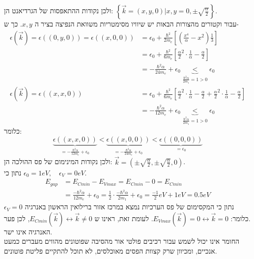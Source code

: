 \documentclass{article}
\begin{document}
\begin{Answer}
ולכן נקודות ההתאפסות של הגרדיאנט הן: ${\left\{ \vec{k}=\left( x,y,0 \right)\vert x,y = 0,\pm\sqrt{\frac{\alpha}{2}} \right\}}$.\\ עבור וקטורים מהצורות הבאות יש שיוויו מסימטריות משוואת הנפיצה בציר ה ${x,y}$. כך ש- 
\begin{align*}
    {\epsilon(\vec{k})=\epsilon((0,y,0))=\epsilon((x,0,0))}&= \epsilon_{0}+\frac{\hbar^2}{2m_{e}}\left[ \left( \frac{x^4}{\alpha}-x^2 \right)\frac{1}{3}\right]\\
    &=\epsilon_{0}+\frac{\hbar^2}{6m_{e}}\left[ \frac{\alpha}{2}^2\cdot\frac{1}{\alpha}-\frac{\alpha}{2} \right]\\
    &= - \frac{\hbar^{2} \alpha}{24 m_{e}} + \epsilon_{0} \underbrace{<}_{\frac{\hbar^2\alpha}{2m_1}=1>0}\epsilon_{0}\\
    \epsilon(\vec{k})=\epsilon((x,x,0))&=\epsilon_{0}+\frac{\hbar^2}{6m_{e}}\left[ \frac{\alpha}{2}^2\cdot\frac{1}{\alpha}-\frac{\alpha}{2} +\frac{\alpha}{2}^2\cdot\frac{1}{\alpha}-\frac{\alpha}{2} \right]\\
    &= - \frac{\hbar^{2} \alpha}{12 m_{e}} + \epsilon_{0} \underbrace{<}_{\frac{\hbar^2\alpha}{2m_1}=1>0}\epsilon_{0}
\end{align*}
כלומר:
\begin{equation*}
    \underbrace{\epsilon((x,x,0))}_{=- \frac{\hbar^{2} \alpha}{12 m_{e}} + \epsilon_{0}}<\underbrace{\epsilon((x,0,0))}_{=- \frac{\hbar^{2} \alpha}{24 m_{e}} + \epsilon_{0}}<\underbrace{\epsilon((0,0,0))}_{=\epsilon_{0}}
\end{equation*}
ולכן נקודות המינימום של פס ההולכה הן: $\vec{k}=\left( \pm\sqrt{\frac{\alpha}{2}},\pm\sqrt{\frac{\alpha}{2}},0 \right)$.\\
נתון כי $\epsilon_{0}=1eV,\quad \epsilon_{V}=0eV$.
\begin{align*}
    E_{gap}&=E_{Cmin}-E_{Vmax}=E_{Cmin}-0=E_{Cmin}\\
    &=  \frac{-\hbar^{2} \alpha}{12 m_{e}} + \epsilon_{0}=\frac{1}{2}\cdot \frac{-\hbar^{2} \alpha}{2 m_{1}}+\epsilon_{0}=\frac{-1}{2}eV+1eV=0.5eV
\end{align*}
נתון כי המקסימום של פס הערכיות נמצא במרכז אזור ברילואין הראשון באנרגיה $\epsilon_{V}=0$.כלומר:
$E_{Vmax}(\vec{k})=0\leftrightarrow \vec{k}=0$. לעומת זאת, ראינו ש $E_{Cmin}(\vec{k})\leftrightarrow \vec{k}\neq0$, לכן פער האנרגיה אינו ישר.\\ החומר אינו יכול לשמש עבור רכיבים פולטי אור מהסיבה שפוטונים מהווים מעברים כמעט אנכיים, ומכיוון שרק קצוות הפסים מאוכלסים, לא תוכל להתקיים פליטת פוטונים.\\

\end{Answer}
\end{document}
